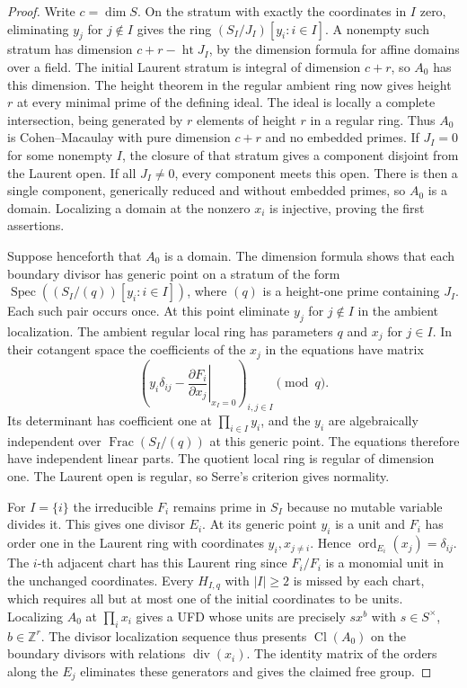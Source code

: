 \documentclass[11pt,reqno]{amsart}
\numberwithin{equation}{section}
\theoremstyle{definition}
\theoremstyle{remark}
\DeclareMathOperator{\Spec}{Spec}
\DeclareMathOperator{\Frac}{Frac}
\DeclareMathOperator{\Cl}{Cl}
\DeclareMathOperator{\ord}{ord}
\begin{document}
\begin{proof}
Write \(c=\dim S\). On the stratum with exactly the coordinates in
\(I\) zero, eliminating \(y_j\) for \(j\notin I\) gives the ring
\((S_I/J_I)[y_i:i\in I]\). A nonempty such stratum has dimension
\(c+r-\operatorname{ht}J_I\), by the dimension formula for affine
domains over a field. The initial Laurent stratum is integral of
dimension \(c+r\), so \(A_0\) has this dimension. The height theorem
in the regular ambient ring now gives height \(r\) at every minimal
prime of the defining ideal. The ideal is locally a complete
intersection, being generated by \(r\) elements of height \(r\) in
a regular ring. Thus \(A_0\) is Cohen--Macaulay with pure dimension
\(c+r\) and no embedded primes. If \(J_I=0\) for some nonempty \(I\),
the closure of that stratum gives a component disjoint from the Laurent
open. If all \(J_I\ne0\), every component meets this open. There is
then a single component, generically reduced and without embedded
primes, so \(A_0\) is a domain. Localizing a domain at the nonzero
\(x_i\) is injective, proving the first assertions.

Suppose henceforth that \(A_0\) is a domain. The dimension formula
shows that each boundary divisor has generic point on a stratum of
the form \(\Spec((S_I/(q))[y_i:i\in I])\), where \((q)\) is a
height-one prime containing \(J_I\). Each such pair occurs once.
At this point eliminate \(y_j\) for \(j\notin I\) in the ambient
localization. The ambient regular local ring has parameters \(q\)
and \(x_j\) for \(j\in I\). In their cotangent space the coefficients
of the \(x_j\) in the equations have matrix
\[ \left(y_i\delta_{ij} -\left.\frac{\partial F_i}{\partial x_j}\right|_{x_I=0} \right)_{i,j\in I}\pmod q . \]
Its determinant has coefficient one at \(\prod_{i\in I}y_i\), and the
\(y_i\) are algebraically independent over \(\Frac(S_I/(q))\) at
this generic point. The equations therefore have independent linear
parts. The quotient local ring is regular of dimension one. The
Laurent open is regular, so Serre's criterion gives normality.

For \(I=\{i\}\) the irreducible \(F_i\) remains prime in \(S_I\)
because no mutable variable divides it. This gives one divisor
\(E_i\). At its generic point \(y_i\) is a unit and \(F_i\) has
order one in the Laurent ring with coordinates \(y_i,x_{j\ne i}\).
Hence \(\ord_{E_i}(x_j)=\delta_{ij}\). The \(i\)-th adjacent chart has
this Laurent ring since \(\widehat F_i/F_i\) is a monomial unit in
the unchanged coordinates. Every \(H_{I,q}\) with \(|I|\ge2\) is
missed by each chart, which requires all but at most one of the
initial coordinates to be units. Localizing \(A_0\) at \(\prod_i x_i\)
gives a UFD whose units are precisely \(s x^b\) with
\(s\in S^\times\), \(b\in\mathbb Z^r\). The divisor localization
sequence thus presents \(\Cl(A_0)\) on the boundary divisors with
relations \(\operatorname{div}(x_i)\). The identity matrix of the
orders along the \(E_j\) eliminates these generators and gives the
claimed free group.


\end{proof}
\end{document}
